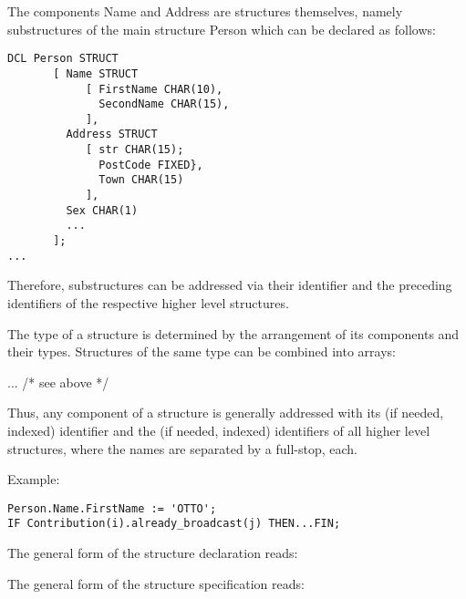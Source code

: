 The components Name and Address are structures themselves, namely
substructures of the main structure Person which can be declared as follows:


\begin{lstlisting}
DCL Person STRUCT  
       [ Name STRUCT 
            [ FirstName CHAR(10),
              SecondName CHAR(15),
            ],
         Address STRUCT 
            [ str CHAR(15);
              PostCode FIXED},
              Town CHAR(15)
            ],
         Sex CHAR(1)
         ...
       ];
...
\end{lstlisting}

Therefore, substructures can be addressed via their identifier and the
preceding identifiers of the respective higher level structures.

The type of a structure is determined by the arrangement of its components
and their types. Structures of the same type can be combined into arrays:

  ...\code{;}  /* see above */

Thus, any component of a structure is generally addressed with its (if
needed, indexed) identifier and the (if needed, indexed) identifiers of
all higher level structures, where the names are separated by a full-stop,
each.

Example:

\begin{lstlisting}
Person.Name.FirstName := 'OTTO';
IF Contribution(i).already_broadcast(j) THEN...FIN;
\end{lstlisting}

The general form of the structure declaration reads:

\begin{grammarframe}








\end{grammarframe}

The general form of the structure specification reads:

\begin{grammarframe}


\end{grammarframe}


